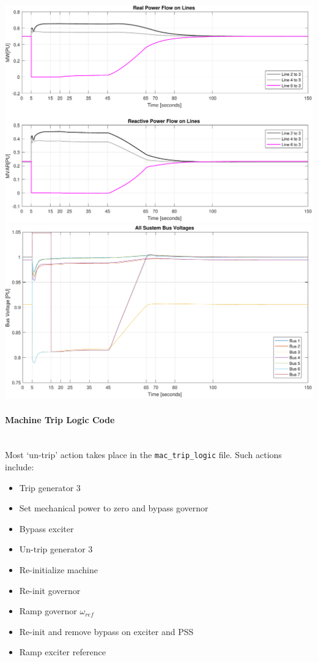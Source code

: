 \documentclass[12pt]{article}
\begin{document}
\pagebreak
\includegraphics[width=\linewidth]{combinedLoadFlow}
\includegraphics[width=\linewidth]{combinedBusV}


\pagebreak
\paragraph{Machine Trip Logic Code} \ \\
Most `un-trip' action takes place in the \verb|mac_trip_logic| file.
Such actions include:
\begin{itemize}
\item Trip generator 3
\item Set mechanical power to zero and bypass governor
\item Bypass exciter
\item Un-trip generator 3
\item Re-initialize machine
\item Re-init governor
\item Ramp governor $\omega_{ref}$
\item Re-init and remove bypass on exciter and PSS
\item Ramp exciter reference
\end{itemize} 
\end{document}
